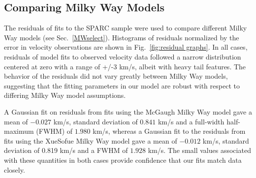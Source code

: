 \documentclass[reprint,%
 amsmath,amssymb,
 aps,
]{revtex4-1}
\begin{document}
    
   \subsection{Comparing Milky Way Models} 
   
   
    The residuals of fits to the SPARC sample were used to compare different Milky Way models (see Sec.~\ref{MWselect}).  Histograms of residuals normalized by the error in velocity observations are shown in Fig.~\ref{fig:residual graphs}. 
     In all cases, residuals of model fits to observed velocity data followed a narrow distribution centered at zero with a range of +/-3 km/s, albeit with heavy tail features. The behavior of the residuals did not vary greatly between Milky Way models, suggesting that the fitting parameters in our model are robust with respect to differing Milky Way model assumptions.
    
    A Gaussian fit on residuals from fits using the McGaugh Milky Way model gave a mean of $-0.027$ km/s, standard deviation of $0.841$ km/s and a full-width half-maximum (FWHM) of $1.980$ km/s, whereas a Gaussian fit to the residuals from fits using the XueSofue Milky Way model gave a mean of $-0.012$ km/s, standard deviation of 0.819 km/s and a FWHM of  $1.928$ km/s. The small values associated with these quantities in both cases provide confidence that our fits match data closely.
    
\end{document}
